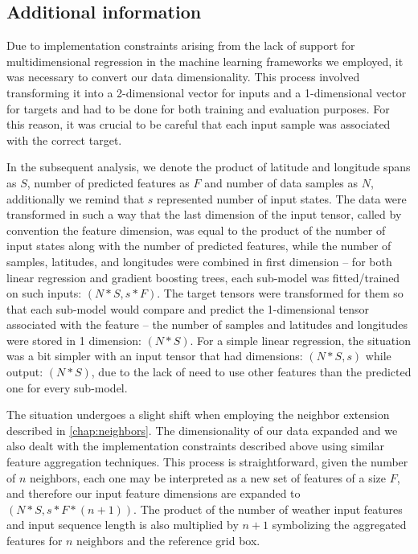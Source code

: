 \subsection{Additional information}
Due to implementation constraints arising from the lack of support for multidimensional regression in the machine learning frameworks we employed, it was necessary to convert our data dimensionality. This process involved transforming it into a 2-dimensional vector for inputs and a 1-dimensional vector for targets and had to be done for both training and evaluation purposes. For this reason, it was crucial to be careful that each input sample was associated with the correct target. 

In the subsequent analysis, we denote the product of latitude and longitude spans as $S$, number of predicted features as $F$ and number of data samples as $N$, additionally we remind that $s$ represented number of input states. The data were transformed in such a way that the last dimension of the input tensor, called by convention the feature dimension, was equal to the product of the number of input states along with the number of predicted features, while the number of samples, latitudes, and longitudes were combined in first dimension -- for both linear regression and gradient boosting trees, each sub-model was fitted/trained on such inputs: $(N*S,s*F)$. The target tensors were transformed for them so that each sub-model would compare and predict the 1-dimensional tensor associated with the feature -- the number of samples and latitudes and longitudes were stored in 1 dimension: $(N*S)$. 
For a simple linear regression, the situation was a bit simpler with an input tensor that had dimensions: $(N*S, s)$ while output: $(N*S)$, due to the lack of need to use other features than the predicted one for every sub-model.

The situation undergoes a slight shift when employing the neighbor extension described in \ref{chap:neighbors}. The dimensionality of our data expanded and we also dealt with the implementation constraints described above using similar feature aggregation techniques. This process is straightforward, given the number of $n$ neighbors, each one may be interpreted as a new set of features of a size $F$, and therefore our input feature dimensions are expanded to $(N*S, s*F*(n+1))$. The product of the number of weather input features and input sequence length is also multiplied by $n+1$ symbolizing the aggregated features for $n$ neighbors and the reference grid box. 

